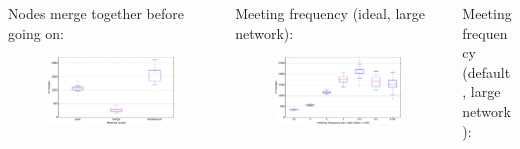\documentclass[final,hyperref={pdfpagelabels=false}]{beamer}
\begin{document}
\begin{frame}
\begin{columns}
\begin{column}{.9\textwidth}
  \begin{columns}
  \begin{column}{.3\textwidth}
    \begin{center}
       Nodes merge together before going on:
    \end{center}
    \begin{figure}
      \includegraphics[width=\linewidth]{fig/bidi_n=20.pdf}
    \end{figure}
  \end{column}
  \begin{column}{.3\textwidth}
    \begin{center}
    Meeting frequency (ideal, large network):
    \end{center}
    \begin{figure}
      \includegraphics[width=\linewidth]{fig/global_meeting_frequency_n=30.pdf}
    \end{figure}
  \end{column}
  \begin{column}{.3\textwidth}
    \begin{center}
    Meeting frequency (default, large network):
    \end{center}
    \begin{figure}

\end{figure}
\end{column}
\end{columns}
\end{column}
\end{columns}
\end{frame}
\end{document}
